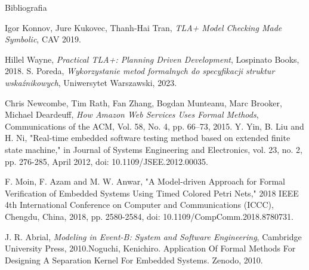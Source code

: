 \documentclass{purdue-poster}
\begin{document}
\begin{frame}{}
\begin{columns}[c]
\begin{column}{.48\linewidth}
\begin{block}{\large Bibliografia}
{\begin{thebibliography}{00}
            Igor Konnov, Jure Kukovec, Thanh-Hai Tran, \emph{TLA+ Model Checking Made Symbolic}, CAV 2019.
        
            Hillel Wayne, \emph{Practical TLA+: Planning Driven Development}, Lospinato Books, 2018.
            S. Poreda,
            \textit{Wykorzystanie metod formalnych do specyfikacji struktur wskaźnikowych},
            Uniwersytet Warszawski, 2023.

            Chris Newcombe, Tim Rath, Fan Zhang, Bogdan Munteanu, Marc Brooker, Michael Deardeuff, \emph{How Amazon Web Services Uses Formal Methods}, Communications of the ACM, Vol. 58, No. 4, pp. 66--73, 2015.
            Y. Yin, B. Liu and H. Ni, "Real-time embedded software testing method based on extended finite state machine," in Journal of Systems Engineering and Electronics, vol. 23, no. 2, pp. 276-285, April 2012, doi: 10.1109/JSEE.2012.00035.
            
            F. Moin, F. Azam and M. W. Anwar, "A Model-driven Approach for Formal Verification of Embedded Systems Using Timed Colored Petri Nets," 2018 IEEE 4th International Conference on Computer and Communications (ICCC), Chengdu, China, 2018, pp. 2580-2584, doi: 10.1109/CompComm.2018.8780731.

            J. R. Abrial, \emph{Modeling in Event-B: System and Software Engineering}, Cambridge University Press, 2010.Noguchi, Kenichiro. Application Of Formal Methods For Designing A Separation Kernel For Embedded Systems. Zenodo, 2010.

        \end{thebibliography}
        }
    \end{block}
    \end{column}
    \end{columns}
    \vfill
\end{frame}
\end{document}
